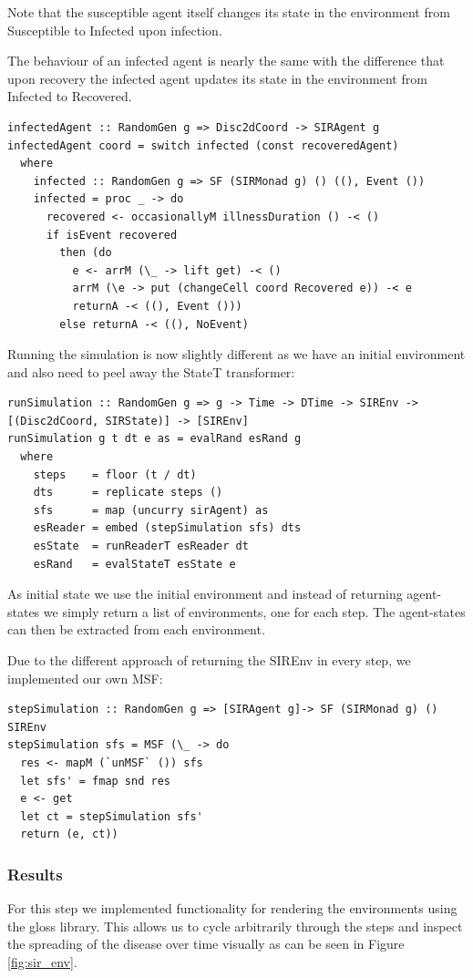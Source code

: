 Note that the susceptible agent itself changes its state in the environment from Susceptible to Infected upon infection.

The behaviour of an infected agent is nearly the same with the difference that upon recovery the infected agent updates its state in the environment from Infected to Recovered.

\begin{verbatim}
infectedAgent :: RandomGen g => Disc2dCoord -> SIRAgent g
infectedAgent coord = switch infected (const recoveredAgent)
  where
    infected :: RandomGen g => SF (SIRMonad g) () ((), Event ())
    infected = proc _ -> do
      recovered <- occasionallyM illnessDuration () -< ()
      if isEvent recovered
        then (do
          e <- arrM (\_ -> lift get) -< ()
          arrM (\e -> put (changeCell coord Recovered e)) -< e
          returnA -< ((), Event ()))
        else returnA -< ((), NoEvent)
\end{verbatim}

Running the simulation is now slightly different as we have an initial environment and also need to peel away the StateT transformer:
\begin{verbatim}
runSimulation :: RandomGen g => g -> Time -> DTime -> SIREnv -> [(Disc2dCoord, SIRState)] -> [SIREnv]
runSimulation g t dt e as = evalRand esRand g
  where
    steps    = floor (t / dt)
    dts      = replicate steps ()
    sfs      = map (uncurry sirAgent) as
    esReader = embed (stepSimulation sfs) dts
    esState  = runReaderT esReader dt
    esRand   = evalStateT esState e
\end{verbatim}

As initial state we use the initial environment and instead of returning agent-states we simply return a list of environments, one for each step. The agent-states can then be extracted from each environment.

Due to the different approach of returning the SIREnv in every step, we implemented our own MSF:
\begin{verbatim}
stepSimulation :: RandomGen g => [SIRAgent g]-> SF (SIRMonad g) () SIREnv
stepSimulation sfs = MSF (\_ -> do
  res <- mapM (`unMSF` ()) sfs
  let sfs' = fmap snd res
  e <- get
  let ct = stepSimulation sfs'
  return (e, ct))
\end{verbatim}

\subsubsection{Results}
For this step we implemented functionality for rendering the environments using the gloss library. This allows us to cycle arbitrarily through the steps and inspect the spreading of the disease over time visually as can be seen in Figure \ref{fig:sir_env}.

